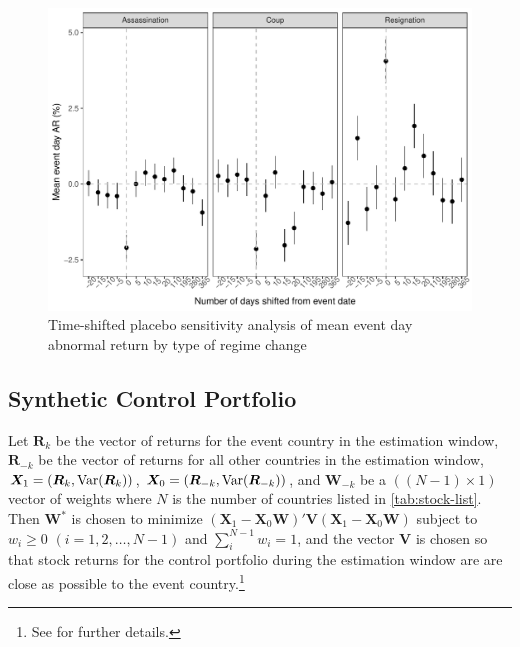 \documentclass[12pt,final,fleqn]{article}
\theoremstyle{plain}
\newcommand\var{{\rm Var}}
\begin{document}
\begin{figure}[!htb]
\includegraphics{../figs/mean-ar-by-regime-change-type-placebo.pdf}
\caption{Time-shifted placebo sensitivity analysis of mean event day abnormal return by type of regime change}
\label{fig:mean-event-day-ar-by-regime-change}
\end{figure}

\pagebreak

\subsection{Synthetic Control Portfolio}
Let $\boldsymbol{R}_{k}$ be the vector of returns for the event country in the estimation window, $\boldsymbol{R}_{-k}$ be the vector of returns for all other countries in the estimation window, $\boldsymbol{X}_1=(\boldsymbol{R}_{k},\var(\boldsymbol{R}_{k}))$, $\boldsymbol{X}_0=(\boldsymbol{R}_{-k},\var(\boldsymbol{R}_{-k}))$, and $\boldsymbol{W}_{-k}$ be a $((N-1) \times 1)$ vector of weights where $N$ is the number of countries listed in \autoref{tab:stock-list}. Then $\boldsymbol{W}^*$ is chosen to minimize $(\boldsymbol{X}_1-\boldsymbol{X}_0\boldsymbol{W})'\boldsymbol{V}(\boldsymbol{X}_1-\boldsymbol{X}_0\boldsymbol{W})$ subject to $w_i\geq0$ $(i = 1,2,\ldots,N-1)$ and $\sum_i^{N-1} w_i = 1$, and the vector $\boldsymbol{V}$ is chosen so that stock returns for the control portfolio during the estimation window are are close as possible to the event country.\footnote{See \citet{abadie2003economic} for further details.}


\clearpage
\pagebreak



\end{document}
